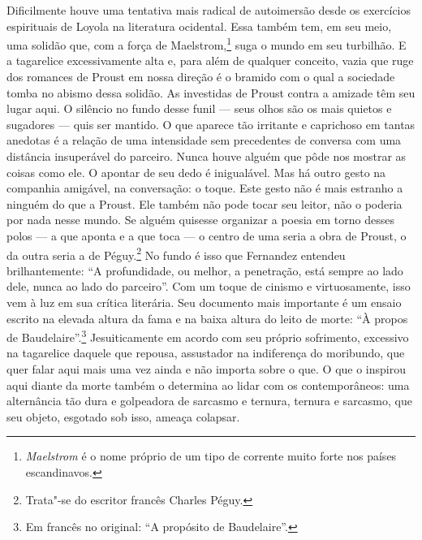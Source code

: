Dificilmente houve uma tentativa mais radical de autoimersão desde os
exercícios espirituais de Loyola na literatura ocidental. Essa também
tem, em seu meio, uma solidão que, com a força de Maelstrom,\footnote{\emph{Maelstrom} é o nome próprio de um tipo de corrente muito forte
  nos países escandinavos. \versal{[N.~T.]}} suga o mundo em seu turbilhão. E a
tagarelice excessivamente alta e, para além de qualquer conceito, vazia
que ruge dos romances de Proust em nossa direção é o bramido com o qual
a sociedade tomba no abismo dessa solidão. As investidas de Proust
contra a amizade têm seu lugar aqui. O silêncio no fundo desse funil ---
seus olhos são os mais quietos e sugadores --- quis ser mantido. O que
aparece tão irritante e caprichoso em tantas anedotas é a relação de uma
intensidade sem precedentes de conversa com uma distância insuperável do
parceiro. Nunca houve alguém que pôde nos mostrar as coisas como ele. O
apontar de seu dedo é inigualável. Mas há outro gesto na companhia
amigável, na conversação: o toque. Este gesto não é mais estranho a
ninguém do que a Proust. Ele também não pode tocar seu leitor, não o
poderia por nada nesse mundo. Se alguém quisesse organizar a poesia em
torno desses polos --- a que aponta e a que toca --- o centro de uma seria
a obra de Proust, o da outra seria a de Péguy.\footnote{Trata"-se do
  escritor francês Charles Péguy. \versal{[N.~O.]}} No fundo é isso que Fernandez
entendeu brilhantemente: ``A profundidade, ou melhor, a penetração, está
sempre ao lado dele, nunca ao lado do parceiro''. Com um toque de
cinismo e virtuosamente, isso vem à luz em sua crítica literária. Seu
documento mais importante é um ensaio escrito na elevada altura da fama e
na baixa altura do leito de morte: ``À propos de Baudelaire''.\footnote{Em francês no  original: ``A propósito de Baudelaire''. \versal{[N.~T.]}} Jesuiticamente em acordo com seu próprio
sofrimento, excessivo na tagarelice daquele que repousa, assustador na
indiferença do moribundo, que quer falar aqui mais uma vez ainda e não
importa sobre o que. O que o inspirou aqui diante da morte também o
determina ao lidar com os contemporâneos: uma alternância tão dura e
golpeadora de sarcasmo e ternura, ternura e sarcasmo, que seu objeto,
esgotado sob isso, ameaça colapsar.

